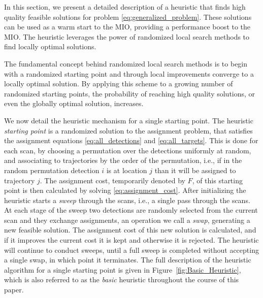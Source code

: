 In this section, we present a detailed description of a heuristic that finds high quality feasible solutions for problem \eqref{eq:generalized_problem}. These solutions can be used as a warm start to the MIO, providing a performance boost to the MIO. The heuristic leverages the power of randomized local search methods to find locally optimal solutions. 

The fundamental concept behind randomized local search methods is to begin with a randomized starting point and through local improvements converge to a locally optimal solution. By applying this scheme to a growing number of randomized starting points, the probability of reaching high quality solutions, or even the globally optimal solution, increases.

We now detail the heuristic mechanism for a single starting point. The heuristic \textit{starting point} is a randomized solution to the assignment problem, that satisfies the assignment equations \eqref{eq:all_detections} and \eqref{eq:all_targets}. This is done for each scan, by choosing a permutation over the detections uniformly at random, and associating to trajectories by the order of the permutation, i.e., if in the random permutation detection $i$ is at location $j$ than it will be assigned to trajectory $j$. The assignment cost, temporarily denoted by $F$, of this starting point is then calculated by solving \eqref{eq:assignment_cost}. After initializing the heuristic starts a \textit{sweep} through the scans, i.e., a single pass through the scans. At each stage of the sweep two detections are randomly selected from the current scan and they exchange assignments, an operation we call a \textit{swap}, generating a new feasible solution. The assignment cost of this new solution is calculated, and if it improves the current cost it is kept and otherwise it is rejected. The heuristic will continue to conduct sweeps, until a full sweep is completed without accepting a single swap, in which point it terminates. The full description of the heuristic algorithm for a single starting point is given in Figure~\ref{fig:Basic_Heuristic}, which is also referred to as the \textit{basic} heuristic throughout the course of this paper. 
